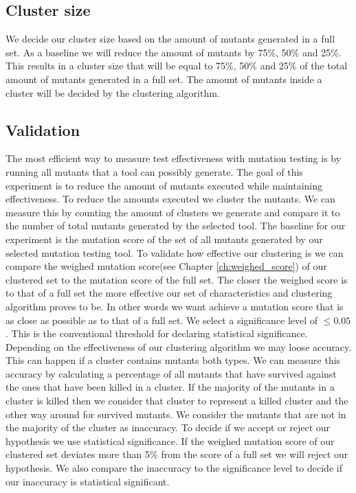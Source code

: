 \documentclass[../../main]{subfiles}
\begin{document}
\subsection{Cluster size}
We decide our cluster size based on the amount of mutants generated in a full set.
As a baseline we will reduce the amount of mutants by 75\%, 50\% and 25\%.
This results in a cluster size that will be equal to 75\%, 50\% and 25\% of the total amount of mutants generated in a full set.
The amount of mutants inside a cluster will be decided by the clustering algorithm.

\subsection{Validation}
The most efficient way to measure test effectiveness with mutation testing is by running all mutants that a tool can possibly generate.
The goal of this experiment is to reduce the amount of mutants executed while maintaining effectiveness.
To reduce the amounts executed we cluster the mutants. 
We can measure this by counting the amount of clusters we generate and compare it to the number of total mutants generated by the selected tool.
\newline
The baseline for our experiment is the mutation score of the set of all mutants generated by our selected mutation testing tool.
\newline
To validate how effective our clustering is we can compare the weighed mutation score(see Chapter \ref{ch:weighed_score}) of our clustered set to the mutation score of the full set.
The closer the weighed score is to that of a full set the more effective our set of characteristics and clustering algorithm proves to be.
In other words we want achieve a mutation score that is as close as possible as to that of a full set.
We select a significance level of $\leq 0.05$.
This is the conventional threshold for declaring statistical significance\cite{Kirk1996PracticalCome}.
\newline
Depending on the effectiveness of our clustering algorithm we may loose accuracy.
This can happen if a cluster contains mutants both types. 
We can measure this accuracy by calculating a percentage of all mutants that have survived against the ones that have been killed in a cluster.
If the majority of the mutants in a cluster is killed then we consider that cluster to represent a killed cluster and the other way around for survived mutants.
We consider the mutants that are not in the majority of the cluster as inaccuracy.
\newline
To decide if we accept or reject our hypothesis we use statistical significance\cite{Kirk1996PracticalCome}.
If the weighed mutation score of our clustered set deviates more than 5\% from the score of a full set we will reject our hypothesis.
We also compare the inaccuracy to the significance level to decide if our inaccuracy is statistical significant.
\end{document}
